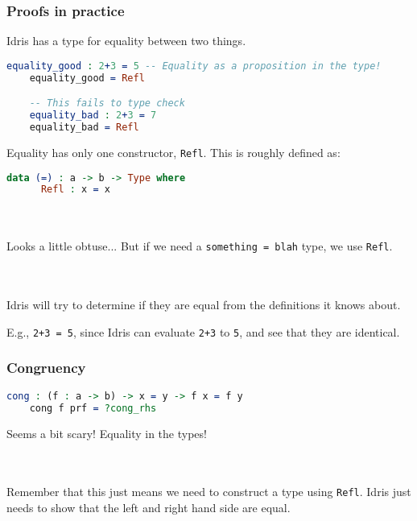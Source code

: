 \documentclass{beamer}
\begin{document}
\begin{frame}[fragile]
  \frametitle{Proofs in practice}

  Idris has a type for equality between two things.

  \pause
  \begin{lstlisting}[language=Idris]
    equality_good : 2+3 = 5 -- Equality as a proposition in the type!
    equality_good = Refl

    -- This fails to type check
    equality_bad : 2+3 = 7
    equality_bad = Refl
  \end{lstlisting}

  \pause
  Equality has only one constructor, \texttt{Refl}. This is roughly defined as:

  \pause
  \begin{lstlisting}[language=Idris]
    data (=) : a -> b -> Type where
      Refl : x = x
  \end{lstlisting}

  \pause \\~\\

  Looks a little obtuse... But if we need a \texttt{something = blah} type, we use \texttt{Refl}.

  \pause \\~\\

  Idris will try to determine if they are equal from the definitions it knows about.

  \pause
  E.g., \texttt{2+3 = 5}, since Idris can evaluate \texttt{2+3} to \texttt{5}, and see that they are identical.
\end{frame}

\begin{frame}[fragile]
  \frametitle{Congruency}

  \begin{lstlisting}[language=Idris]
    cong : (f : a -> b) -> x = y -> f x = f y
    cong f prf = ?cong_rhs
  \end{lstlisting}

  \pause
  Seems a bit scary! Equality in the types!

  \pause \\~\\
  Remember that this just means we need to construct a type using
  \texttt{Refl}. Idris just needs to show that the left and right hand
  side are equal.
\end{frame}
\end{document}
